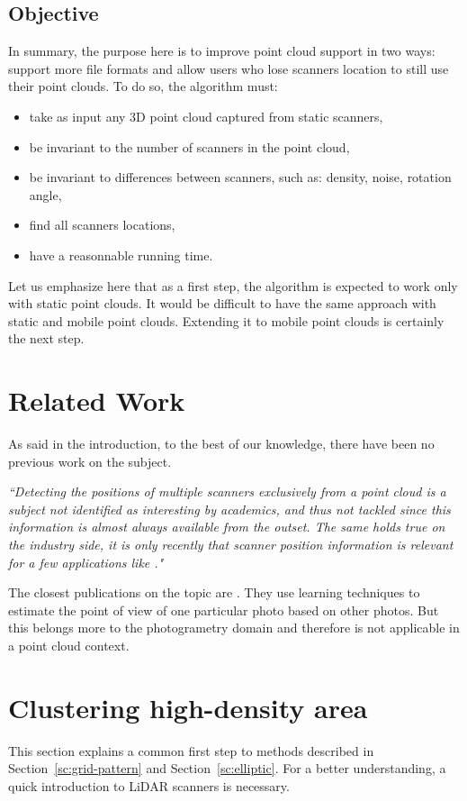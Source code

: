 \subsection{Objective}
In summary, the purpose here is to improve \CC point cloud support in two ways: support more file formats and allow users who lose scanners location to still use their point clouds. To do so, the algorithm must:
\begin{itemize}
  \item take as input any 3D point cloud captured from static scanners,
  \item be invariant to the number of scanners in the point cloud,
  \item be invariant to differences between scanners, such as: density, noise, rotation angle,
  \item find all scanners locations,
  \item have a reasonnable running time.
\end{itemize}

Let us emphasize here that as a first step, the algorithm is expected to work only with static point clouds. It would be difficult to have the same approach with static and mobile point clouds. Extending it to mobile point clouds is certainly the next step.



\section{Related Work}
\label{sc:related-scanfinder}
As said in the introduction, to the best of our knowledge, there have been no previous work on the subject.

\emph{``Detecting the positions of multiple scanners exclusively from a point cloud is a subject not identified as interesting by academics, and thus not tackled since this information is almost always available from the outset. The same holds true on the industry side, it is only recently that scanner position information is relevant for a few applications like \CC."}

The closest publications on the topic are \cite{ml1, ml2, ml3, ml4, ml5}. They use learning techniques to estimate the point of view of one particular photo based on other photos. But this belongs more to the photogrametry domain and therefore is not applicable in a point cloud context.



\section{Clustering high-density area}
\label{sc:highdens}
This section explains a common first step to methods described in Section~\ref{sc:grid-pattern} and Section~\ref{sc:elliptic}. For a better understanding, a quick introduction to LiDAR scanners is necessary.

